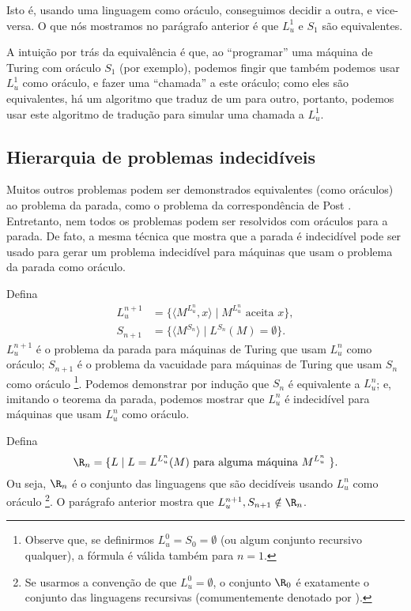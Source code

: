 Isto é, usando uma linguagem como oráculo, conseguimos decidir a outra,
e vice-versa.
O que nós mostramos no parágrafo anterior é que
$L_u^1$ e $S_1$ são equivalentes.

A intuição por trás da equivalência é que,
ao ``programar'' uma máquina de Turing com oráculo $S_1$ (por exemplo),
podemos fingir que também podemos usar $L_u^1$ como oráculo,
e fazer uma ``chamada'' a este oráculo;
como eles são equivalentes,
há um algoritmo que traduz de um para outro,
portanto, podemos usar este algoritmo de tradução
para simular uma chamada a $L_u^1$.

\subsection{Hierarquia de problemas indecidíveis}

Muitos outros problemas podem ser demonstrados equivalentes
(como oráculos)
ao problema da parada,
como o problema da correspondência de Post \cite[p. 214]{HopcroftUllman1979}.
Entretanto,
nem todos os problemas podem ser resolvidos com oráculos para a parada.
De fato, a mesma técnica que mostra que a parada é indecidível
pode ser usado para gerar um problema indecidível
para máquinas que usam o problema da parada como oráculo.

Defina
\begin{align*}
    L_u^{n+1} &= \{ \langle M^{L_u^n}, x \rangle \mid M^{L_u^n} \text{ aceita } x \}, \\
    S_{n+1} &= \{ \langle M^{S_n} \rangle \mid L^{S_n}(M) = \emptyset \}.
\end{align*}
$L_u^{n+1}$ é o problema da parada
para máquinas de Turing que usam $L_u^n$ como oráculo;
$S_{n+1}$ é o problema da vacuidade
para máquinas de Turing que usam $S_n$ como oráculo%
\footnote{
    Observe que,
    se definirmos $L_u^0 = S_0 = \emptyset$
    (ou algum conjunto recursivo qualquer),
    a fórmula é válida também para $n = 1$.
}.
Podemos demonstrar por indução que $S_n$ é equivalente a $L_u^n$;
e, imitando o teorema da parada,
podemos mostrar que $L_u^n$ é indecidível para máquinas que usam $L_u^n$ como oráculo.

Defina
\begin{equation*}
    \R_n = \{ L \mid L = L^{L_u^n}(M) \text{ para alguma máquina $M^{L_u^n}$ } \}.
\end{equation*}
Ou seja, $\R_n$ é o conjunto das linguagens
que são decidíveis usando $L_u^n$ como oráculo%
\footnote{
    Se usarmos a convenção de que $L_u^0 = \emptyset$,
    o conjunto $\R_0$ é exatamente o conjunto das linguagens recursivas
    (comumentemente denotado por \R).
}.
O parágrafo anterior mostra que $L_u^{n+1}, S_{n+1} \notin \R_n$.

